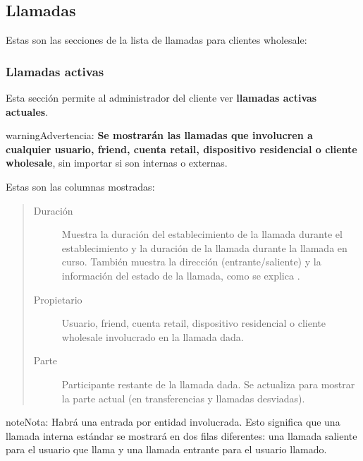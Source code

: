 \documentclass[letterpaper,10pt,spanish]{sphinxmanual}
\begin{document}
\subsection{Llamadas}
\label{administration_portal/client/wholesale/calls/index::doc}\label{administration_portal/client/wholesale/calls/index:calls}
Estas son las secciones de la lista de llamadas para clientes wholesale:


\subsubsection{Llamadas activas}
\label{administration_portal/client/wholesale/calls/active_calls::doc}\label{administration_portal/client/wholesale/calls/active_calls:active-calls}
Esta sección permite al administrador del cliente ver \textbf{llamadas activas actuales}.

\begin{notice}{warning}{Advertencia:}
\textbf{Se mostrarán las llamadas que involucren a cualquier usuario, friend, cuenta retail, dispositivo residencial o cliente wholesale}, sin importar si son internas o externas.
\end{notice}

Estas son las columnas mostradas:
\begin{quote}
\begin{description}
\item[{Duración}] \leavevmode
Muestra la duración del establecimiento de la llamada durante el establecimiento y la duración de la llamada durante la llamada en curso. También muestra la dirección (entrante/saliente) y la información del estado de la llamada, como se explica {\hyperref[administration_portal/platform/active_calls:call\string-state]{}}.

\item[{Propietario}] \leavevmode
Usuario, friend, cuenta retail, dispositivo residencial o cliente wholesale involucrado en la llamada dada.

\item[{Parte}] \leavevmode
Participante restante de la llamada dada. Se actualiza para mostrar la parte actual (en transferencias y llamadas desviadas).

\end{description}
\end{quote}

\begin{notice}{note}{Nota:}
Habrá una entrada por entidad involucrada. Esto significa que una llamada interna estándar se mostrará en dos filas diferentes: una llamada saliente para el usuario que llama y una llamada entrante para el usuario llamado.
\end{notice}
\end{document}
